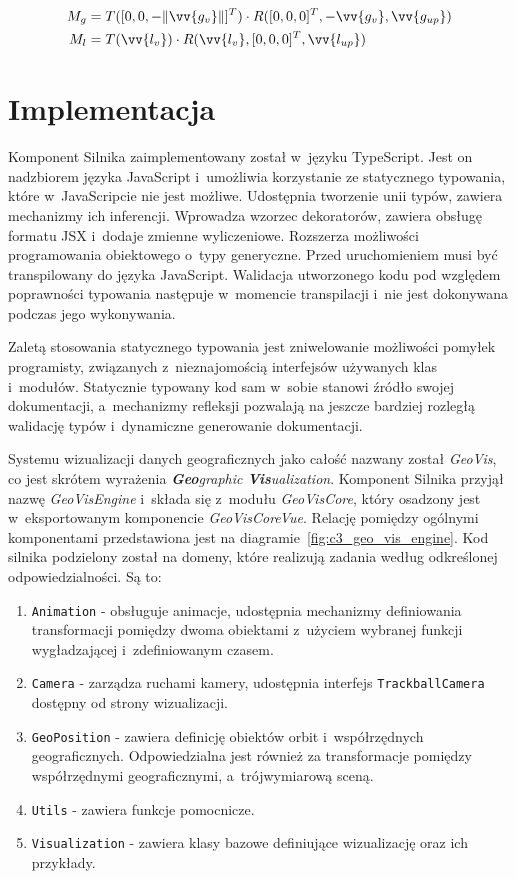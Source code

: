 \begin{align}
    \label{eq:t_1}
      M_g &= T([0, 0, -\Vert\vv{g_v}\Vert]^T) \cdot R([0, 0, 0]^T, -\vv{g_v}, \vv{g_{up}}) \\
    \label{eq:t_2}
      M_l &= T(\vv{l_v}) \cdot R(\vv{l_v}, [0, 0, 0]^T, \vv{l_{up}})
\end{align}

\section{Implementacja}

Komponent Silnika zaimplementowany został w~języku TypeScript\cite{TypeScript}. Jest on nadzbiorem języka JavaScript i~umożliwia korzystanie ze statycznego typowania, które w~JavaScripcie nie jest możliwe. Udostępnia tworzenie unii typów, zawiera mechanizmy ich inferencji. Wprowadza wzorzec dekoratorów, zawiera obsługę formatu JSX i~dodaje zmienne wyliczeniowe. Rozszerza możliwości programowania obiektowego o~typy generyczne. Przed uruchomieniem musi być transpilowany do języka JavaScript. Walidacja utworzonego kodu pod względem poprawności typowania następuje w~momencie transpilacji i~nie jest dokonywana podczas jego wykonywania. 

Zaletą stosowania statycznego typowania jest zniwelowanie możliwości pomyłek programisty, związanych z~nieznajomością interfejsów używanych klas i~modułów. Statycznie typowany kod sam w~sobie stanowi źródło swojej dokumentacji, a~mechanizmy refleksji pozwalają na jeszcze bardziej rozległą walidację typów i~dynamiczne generowanie dokumentacji.

Systemu wizualizacji danych geograficznych jako całość nazwany został \textit{GeoVis}, co jest skrótem wyrażenia \textit{\textbf{Geo}graphic \textbf{Vis}ualization}. Komponent Silnika przyjął nazwę \mbox{\textit{GeoVisEngine}} i~składa się z~modułu \mbox{\textit{GeoVisCore}}, który osadzony jest w~eksportowanym komponencie \mbox{\textit{GeoVisCoreVue}}. Relację pomiędzy ogólnymi komponentami przedstawiona jest na diagramie~\ref{fig:c3_geo_vis_engine}. Kod silnika podzielony został na domeny, które realizują zadania według odkreślonej odpowiedzialności. Są to:

\begin{enumerate}
    \item \texttt{Animation} - obsługuje animacje, udostępnia mechanizmy definiowania transformacji pomiędzy dwoma obiektami z~użyciem wybranej funkcji wygładzającej i~zdefiniowanym czasem.
    \item \texttt{Camera} - zarządza ruchami kamery, udostępnia interfejs \texttt{TrackballCamera} dostępny od strony wizualizacji.
    \item \texttt{GeoPosition} - zawiera definicję obiektów orbit i~współrzędnych geograficznych. Odpowiedzialna jest również za transformacje pomiędzy współrzędnymi geograficznymi, a~trójwymiarową sceną.
    \item \texttt{Utils} - zawiera funkcje pomocnicze.
    \item \texttt{Visualization} - zawiera klasy bazowe definiujące wizualizację oraz ich przykłady.
\end{enumerate}

